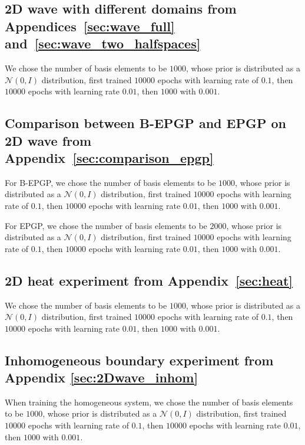 \documentclass{article} %
\theoremstyle{plain}
\theoremstyle{definition}
\theoremstyle{remark}
\begin{document}
\subsection{2D wave with different domains from  Appendices~\ref{sec:wave_full} and~\ref{sec:wave_two_halfspaces}}\label{sec:wave_full_details}
We chose the number of basis elements to be \(1000\), whose prior is distributed as a $\mathcal{N}(0,I)$ distribution, first trained $10000$ epochs with learning rate of $0.1$, then $10000$ epochs with learning rate $0.01$, then $1000$ with $0.001$.

\subsection{Comparison between B-EPGP and EPGP on 2D wave from  Appendix~\ref{sec:comparison_epgp}}\label{sec:comparison_epgp_details}
For B-EPGP, we chose the number of basis elements to be \(1000\), whose prior is distributed as a $\mathcal{N}(0,I)$ distribution, first trained $10000$ epochs with learning rate of $0.1$, then $10000$ epochs with learning rate $0.01$, then $1000$ with $0.001$.

For EPGP, we chose the number of basis elements to be \(2000\), whose prior is distributed as a $\mathcal{N}(0,I)$ distribution, first trained $10000$ epochs with learning rate of $0.1$, then $10000$ epochs with learning rate $0.01$, then $1000$ with $0.001$.

\subsection{2D heat experiment from Appendix~\ref{sec:heat}}\label{sec:heat_details}
We chose the number of basis elements to be \(1000\), whose prior is distributed as a $\mathcal{N}(0,I)$ distribution, first trained $10000$ epochs with learning rate of $0.1$, then $10000$ epochs with learning rate $0.01$, then $1000$ with $0.001$.

\subsection{Inhomogeneous boundary experiment from Appendix \ref{sec:2Dwave_inhom}}\label{sec:inhom_details}
When training the homogeneous system, we chose the number of basis elements to be \(1000\), whose prior is distributed as a $\mathcal{N}(0,I)$ distribution, first trained $10000$ epochs with learning rate of $0.1$, then $10000$ epochs with learning rate $0.01$, then $1000$ with $0.001$.
\end{document}
